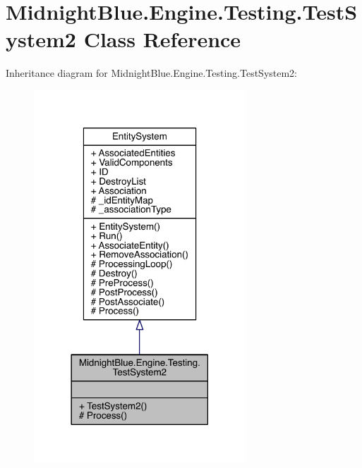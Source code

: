 \hypertarget{class_midnight_blue_1_1_engine_1_1_testing_1_1_test_system2}{}\section{Midnight\+Blue.\+Engine.\+Testing.\+Test\+System2 Class Reference}
\label{class_midnight_blue_1_1_engine_1_1_testing_1_1_test_system2}


Inheritance diagram for Midnight\+Blue.\+Engine.\+Testing.\+Test\+System2\+:
\nopagebreak
\begin{figure}[H]
\begin{center}
\leavevmode
\includegraphics[width=225pt]{class_midnight_blue_1_1_engine_1_1_testing_1_1_test_system2__inherit__graph}
\end{center}
\end{figure}


